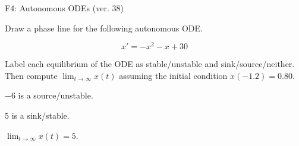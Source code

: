 \begin{exercise}
  \begin{exerciseTitle}F4: Autonomous ODEs (ver. 38)\end{exerciseTitle}
  \begin{exerciseStatement}
    

      Draw a phase line for the following 
      autonomous ODE.
    

    
\[x'= -x^{2} - x + 30\]

    

      Label each equilibrium of the ODE
      as stable/unstable and sink/source/neither.
      Then compute \(\lim_{t\to\infty}x(t)\)
      assuming the initial condition
      \(x( -1.2 )= 0.80\).
    

  \end{exerciseStatement}
  \begin{exerciseAnswer}
    

      \(-6\) is a source/unstable.
      
      \(5\) is a sink/stable.
    

    

      \(\lim_{t\to\infty}x(t)=5\).
    

  \end{exerciseAnswer}
\end{exercise}